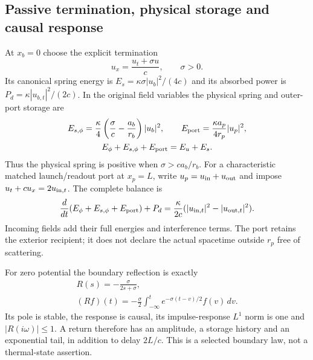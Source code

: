 \documentclass[10pt,twocolumn,letterpaper]{article}
\begin{document}
\subsection{Passive termination, physical storage and causal response}
At $x_b=0$ choose the explicit termination
\begin{equation}
 u_x=\frac{u_t+\sigma u}{c},\qquad \sigma>0.
 \label{eq:wp-boundary}
\end{equation}
Its canonical spring energy is $E_s=\kappa\sigma|u_b|^2/(4c)$ and
its absorbed power is $P_d=\kappa|u_{b,t}|^2/(2c)$. In the original
field variables the physical spring and outer-port storage are
\begin{equation}
\begin{gathered}
 E_{s,\phi}=\frac\kappa4
       \left(\frac\sigma c-\frac{a_b}{r_b}\right)|u_b|^2,
 \qquad E_{\rm port}=\frac{\kappa a_p}{4r_p}|u_p|^2,\\
 E_\phi+E_{s,\phi}+E_{\rm port}=E_u+E_s.
\end{gathered}
\label{eq:wp-paid-spring}
\end{equation}
Thus the physical spring is positive when $\sigma>ca_b/r_b$.
For a characteristic matched launch/readout port at $x_p=L$, write
$u_p=u_{\rm in}+u_{\rm out}$ and impose
$u_t+cu_x=2u_{{\rm in},t}$. The complete balance is
\begin{equation}
 \frac d{dt}(E_\phi+E_{s,\phi}+E_{\rm port})+P_d
 =\frac\kappa{2c}
    (|u_{{\rm in},t}|^2-|u_{{\rm out},t}|^2).
 \label{eq:wp-energy}
\end{equation}
Incoming fields add their full energies and interference terms. The port
retains the exterior recipient; it does not declare the actual spacetime
outside $r_p$ free of scattering.

For zero potential the boundary reflection is exactly
\begin{equation}
\begin{gathered}
 R(s)=-\frac\sigma{2s+\sigma},\\
 (Rf)(t)=-\frac\sigma2\int_{-\infty}^t
            e^{-\sigma(t-v)/2}f(v)\,dv.
\end{gathered}
\label{eq:wp-transfer}
\end{equation}
Its pole is stable, the response is causal, its impulse-response $L^1$
norm is one and $|R(i\omega)|\leq1$. A return therefore has an amplitude,
a storage history and an exponential tail, in addition to delay $2L/c$.
This is a selected boundary law, not a thermal-state assertion.
\end{document}
